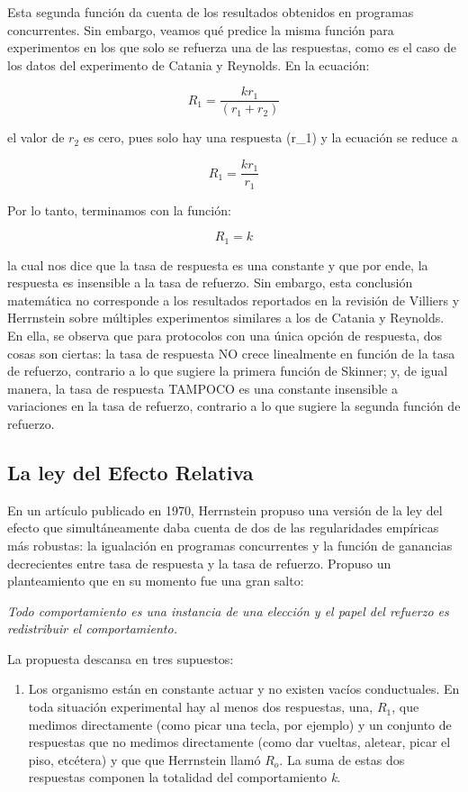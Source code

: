 \documentclass[
  a4paper,
  DIV=11,
  numbers=noendperiod]{scrreprt}
\providecommand{\tightlist}{%
  \setlength{\itemsep}{0pt}\setlength{\parskip}{0pt}}\usepackage{longtable,booktabs,array}
\begin{document}
Esta segunda función da cuenta de los resultados obtenidos en programas
concurrentes. Sin embargo, veamos qué predice la misma función para
experimentos en los que solo se refuerza una de las respuestas, como es
el caso de los datos del experimento de Catania y Reynolds. En la
ecuación:

\[R_1 = \frac {kr_1} {(r_1 + r_2)}\]

el valor de \(r_2\) es cero, pues solo hay una respuesta (r\_1) y la
ecuación se reduce a

\[R_1 = \frac {kr_1} {r_1 }\]

Por lo tanto, terminamos con la función:

\[R_1 = k\]

la cual nos dice que la tasa de respuesta es una constante y que por
ende, la respuesta es insensible a la tasa de refuerzo. Sin embargo,
esta conclusión matemática no corresponde a los resultados reportados en
la revisión de Villiers y Herrnstein sobre múltiples experimentos
similares a los de Catania y Reynolds. En ella, se observa que para
protocolos con una única opción de respuesta, dos cosas son ciertas: la
tasa de respuesta NO crece linealmente en función de la tasa de
refuerzo, contrario a lo que sugiere la primera función de Skinner; y,
de igual manera, la tasa de respuesta TAMPOCO es una constante
insensible a variaciones en la tasa de refuerzo, contrario a lo que
sugiere la segunda función de refuerzo.

\subsection{La ley del Efecto
Relativa}\label{la-ley-del-efecto-relativa}

En un artículo publicado en 1970, Herrnstein propuso una versión de la
ley del efecto que simultáneamente daba cuenta de dos de las
regularidades empíricas más robustas: la igualación en programas
concurrentes y la función de ganancias decrecientes entre tasa de
respuesta y la tasa de refuerzo. Propuso un planteamiento que en su
momento fue una gran salto:

\emph{Todo comportamiento es una instancia de una elección y el papel
del refuerzo es redistribuir el comportamiento.}

La propuesta descansa en tres supuestos:

\begin{enumerate}
\def\labelenumi{\arabic{enumi}.}
\tightlist
\item
  Los organismo están en constante actuar y no existen vacíos
  conductuales. En toda situación experimental hay al menos dos
  respuestas, una, \(R_1\), que medimos directamente (como picar una
  tecla, por ejemplo) y un conjunto de respuestas que no medimos
  directamente (como dar vueltas, aletear, picar el piso, etcétera) y
  que que Herrnstein llamó \(R_o\). La suma de estas dos respuestas
  componen la totalidad del comportamiento \emph{k}.
\end{enumerate}
\end{document}
